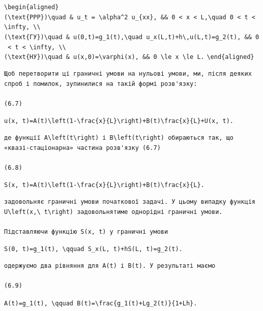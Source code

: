 \documentclass[
  ukrainian,
]{article}
\begin{document}
\texttt{\textbackslash{}begin\{aligned\}}
\texttt{(\textbackslash{}text\{PPP\})\textbackslash{}quad\ \&\ u\_t\ =\ \textbackslash{}alpha\^{}2\ u\_\{xx\},\ \&\&\ 0\ \textless{}\ x\ \textless{}\ L,\textbackslash{}quad\ 0\ \textless{}\ t\ \textless{}\ \textbackslash{}infty,\ \textbackslash{}\textbackslash{}}
\texttt{(\textbackslash{}text\{ГУ\})\textbackslash{}quad\ \&\ u(0,t)=g\_1(t),\textbackslash{}quad\ u\_x(L,t)+h\textbackslash{},u(L,t)=g\_2(t),\ \&\&\ 0\ \textless{}\ t\ \textless{}\ \textbackslash{}infty,\ \textbackslash{}\textbackslash{}}
\texttt{(\textbackslash{}text\{НУ\})\textbackslash{}quad\ \&\ u(x,0)=\textbackslash{}varphi(x),\ \&\&\ 0\ \textbackslash{}le\ x\ \textbackslash{}le\ L.}
\texttt{\textbackslash{}end\{aligned\}}

\begin{verbatim}
Щоб перетворити ці граничні умови на нульові умови, ми, після деяких спроб і помилок, зупинилися на такій формі розв'язку:

(6.7)
\end{verbatim}

\texttt{u(x,\ t)=A(t)\textbackslash{}left(1-\textbackslash{}frac\{x\}\{L\}\textbackslash{}right)+B(t)\textbackslash{}frac\{x\}\{L\}+U(x,\ t).}

\begin{verbatim}
де функції A\left(t\right) і B\left(t\right) обираються так, що «квазі-стаціонарна» частина розв'язку (6.7)

(6.8)
\end{verbatim}

\texttt{S(x,\ t)=A(t)\textbackslash{}left(1-\textbackslash{}frac\{x\}\{L\}\textbackslash{}right)+B(t)\textbackslash{}frac\{x\}\{L\}.}

\begin{verbatim}
задовольняє граничні умови початкової задачі. У цьому випадку функція U\left(x,\ t\right) задовольнятиме однорідні граничні умови.

Підставляючи функцію S(x, t) у граничні умови
\end{verbatim}

\texttt{S(0,\ t)=g\_1(t),\ \textbackslash{}qquad\ S\_x(L,\ t)+hS(L,\ t)=g\_2(t).}

\begin{verbatim}
одержуємо два рівняння для A(t) і B(t). У результаті маємо

(6.9)
\end{verbatim}

\texttt{A(t)=g\_1(t),\ \textbackslash{}qquad\ B(t)=\textbackslash{}frac\{g\_1(t)+Lg\_2(t)\}\{1+Lh\}.}
\end{document}

